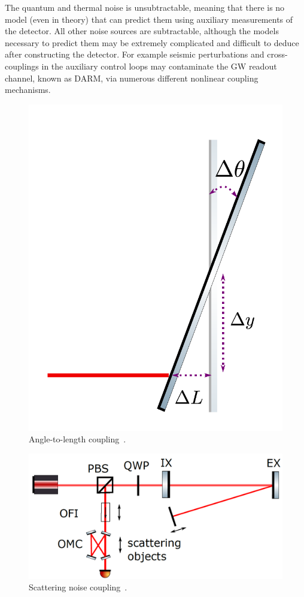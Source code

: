 \begin{refsection}
The quantum and thermal noise is unsubtractable, meaning that there is no model (even in theory) that can predict them using auxiliary measurements of the detector. All other noise sources are subtractable, although the models necessary to predict them may be extremely complicated and difficult to deduce after constructing the detector. For example seismic perturbations and cross-couplings in the auxiliary control loops may contaminate the GW readout channel, known as DARM, via numerous different nonlinear coupling mechanisms.

\begin{figure}[htbp]
   \centering
   \includegraphics[width=0.28\columnwidth]{chapter_noise_sub/etc/a2l}
   \caption{Angle-to-length coupling~\cite{Yu:19}.}
   \label{fig:a2l}
\end{figure}

\begin{figure}[htbp]
   \centering
   \includegraphics[width=0.6\columnwidth]{chapter_noise_sub/etc/scattering}
   \caption{Scattering noise coupling~\cite{Martynov:15}.} 
   \label{fig:scattering}
\end{figure}




\end{refsection}
